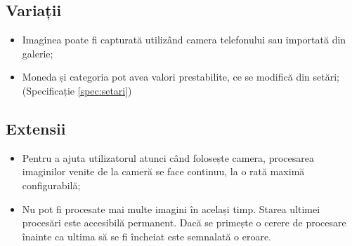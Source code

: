 \begin{minipage}[t]{0.39\textwidth}
  \subsection*{Variații}\label{variaux21bii}
  \begin{itemize}
  \item
    Imaginea poate fi capturată utilizând camera telefonului sau importată
    din galerie;
  \item
    Moneda și categoria pot avea valori prestabilite, ce se modifică din setări; (Specificație \ref{spec:setari})
  \end{itemize}
\end{minipage}
\hspace{0.01\textwidth}
\begin{minipage}[t]{0.6\textwidth}
  \subsection*{Extensii}\label{extensii}
  \begin{itemize}
  \item
    Pentru a ajuta utilizatorul atunci când folosește camera, procesarea
    imaginilor venite de la cameră se face continuu, la o rată maximă
    configurabilă;
  \item
    Nu pot fi procesate mai multe imagini în același timp. Starea ultimei
    procesări este accesibilă permanent. Dacă se primește o cerere de
    procesare înainte ca ultima să se fi încheiat este semnalată o eroare.
  \end{itemize}
\end{minipage}

